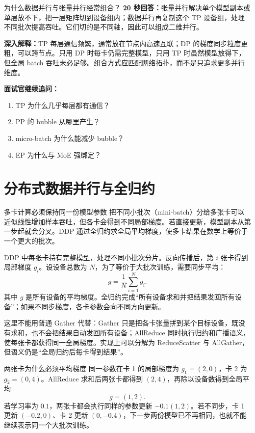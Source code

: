 \begin{interviewbox}{为什么数据并行与张量并行经常组合？}
\textbf{20 秒回答：}张量并行解决单个模型副本或单层放不下，把一层矩阵切到设备组内；数据并行再复制这个 TP 设备组，处理不同批次提高吞吐。它们切的是不同轴，因此可以组成二维并行。

\textbf{深入解释：}TP 每层通信频繁，通常放在节点内高速互联；DP 的梯度同步粒度更粗，可以跨节点。只用 DP 时每卡仍需完整模型，只用 TP 时虽然模型放得下，但全局 batch 吞吐未必足够。组合方式应匹配网络拓扑，而不是只追求更多并行维度。

\textbf{面试官继续追问：}
\begin{enumerate}
  \item TP 为什么几乎每层都有通信？
  \item PP 的 bubble 从哪里产生？
  \item micro-batch 为什么能减少 bubble？
  \item EP 为什么与 MoE 强绑定？
\end{enumerate}
\end{interviewbox}

\section{分布式数据并行与全归约}

\begin{motivationbox}{多卡计算必须保持同一份模型参数}
把不同小批次（mini-batch）分给多张卡可以近似线性增加样本吞吐，但各卡会得到不同局部梯度。若直接更新，模型副本从第一步起就会分叉。DDP 通过全归约求全局平均梯度，使多卡结果在数学上等价于一个更大的批次。
\end{motivationbox}

DDP 中每张卡持有完整模型，处理不同小批次分片。反向传播后，第 $i$ 张卡得到局部梯度 $g_i$。设设备总数为 $N$，为了等价于大批次训练，需要同步平均：
\[
g=\frac{1}{N}\sum_{i=1}^{N}g_i.
\]
其中 $g$ 是所有设备的平均梯度。全归约完成“所有设备求和并把结果发回所有设备”；如果不同步梯度，各卡参数会向不同方向更新。

这里不能用普通 Gather 代替：Gather 只是把各卡张量拼到某个目标设备，既没有求和，也不会把结果自动发回所有设备；AllReduce 同时执行归约和广播语义，使每张卡都获得同一全局梯度。实现上可以分解为 ReduceScatter 与 AllGather，但语义仍是“全局归约后每卡得到结果”。

\begin{examplebox}{两张卡为什么必须平均梯度}
同一参数在卡 1 的局部梯度为 $g_1=(2,0)$，卡 2 为 $g_2=(0,4)$。AllReduce 求和后两张卡都得到 $(2,4)$，再除以设备数得到全局平均
\[
g=(1,2).
\]
若学习率为 $0.1$，两张卡都会执行同样的参数更新 $-0.1(1,2)$。若不同步，卡 1 更新 $(-0.2,0)$、卡 2 更新 $(0,-0.4)$，下一步两份模型已不再相同，也就不能继续表示同一个大批次训练。
\end{examplebox}

